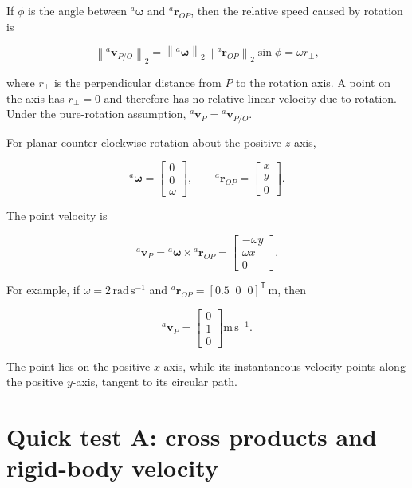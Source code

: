 \documentclass[
  australian,
  12pt,
  letterpaper,
  DIV=11,
  numbers=noendperiod,
  twoside]{scrreprt}
\begin{document}
If \(\phi\) is the angle between \({}^{a}\boldsymbol{\omega}\) and
\({}^{a}\mathbf{r}_{OP}\), then the relative speed caused by rotation is

\[
\left\|{}^{a}\mathbf{v}_{P/O}\right\|_2
=
\left\|{}^{a}\boldsymbol{\omega}\right\|_2
\left\|{}^{a}\mathbf{r}_{OP}\right\|_2
\sin\phi
=
\omega r_\perp,
\]

where \(r_\perp\) is the perpendicular distance from \(P\) to the
rotation axis. A point on the axis has \(r_\perp=0\) and therefore has
no relative linear velocity due to rotation. Under the pure-rotation
assumption, \({}^{a}\mathbf{v}_P={}^{a}\mathbf{v}_{P/O}\).

For planar counter-clockwise rotation about the positive \(z\)-axis,

\[
{}^{a}\boldsymbol{\omega}
=
\begin{bmatrix}
0\\0\\\omega
\end{bmatrix},
\qquad
{}^{a}\mathbf{r}_{OP}
=
\begin{bmatrix}
x\\y\\0
\end{bmatrix}.
\]

The point velocity is

\[
{}^{a}\mathbf{v}_P
=
{}^{a}\boldsymbol{\omega}\times{}^{a}\mathbf{r}_{OP}
=
\begin{bmatrix}
-\omega y\\
\omega x\\
0
\end{bmatrix}.
\]

For example, if \(\omega=2\,\mathrm{rad\,s^{-1}}\) and
\({}^{a}\mathbf{r}_{OP}=[0.5\;\;0\;\;0]^\mathsf{T}\,\mathrm{m}\), then

\[
{}^{a}\mathbf{v}_P
=
\begin{bmatrix}
0\\1\\0
\end{bmatrix}
\mathrm{m\,s^{-1}}.
\]

The point lies on the positive \(x\)-axis, while its instantaneous
velocity points along the positive \(y\)-axis, tangent to its circular
path.

\section*{Quick test A: cross products and rigid-body
velocity}\label{quick-test-a-cross-products-and-rigid-body-velocity}
\end{document}
